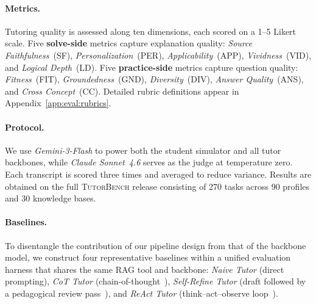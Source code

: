 \paragraph{Metrics.}
Tutoring quality is assessed along ten dimensions, each scored on a 1--5 Likert scale.
Five \textbf{solve-side} metrics capture explanation quality: \emph{Source Faithfulness}~(SF), \emph{Personalization}~(PER), \emph{Applicability}~(APP), \emph{Vividness}~(VID), and \emph{Logical Depth}~(LD).
Five \textbf{practice-side} metrics capture question quality: \emph{Fitness}~(FIT), \emph{Groundedness}~(GND), \emph{Diversity}~(DIV), \emph{Answer Quality}~(ANS), and \emph{Cross Concept}~(CC).
Detailed rubric definitions appear in Appendix~\ref{app:eval:rubrics}.

\paragraph{Protocol.}
We use \emph{Gemini-3-Flash} to power both the student simulator and all tutor backbones, while \emph{Claude Sonnet~4.6} serves as the judge at temperature zero.
Each transcript is scored three times and averaged to reduce variance.
Results are obtained on the full \textsc{TutorBench} release consisting of 270 tasks across 90 profiles and 30 knowledge bases.

\paragraph{Baselines.}
To disentangle the contribution of our pipeline design from that of the backbone model, we construct four representative baselines within a unified evaluation harness that shares the same RAG tool and backbone:
\emph{Naive Tutor} (direct prompting),
\emph{CoT Tutor} (chain-of-thought~\citep{wei2022chain}),
\emph{Self-Refine Tutor} (draft followed by a pedagogical review pass~\citep{madaan2024selfrefine}), and
\emph{ReAct Tutor} (think--act--observe loop~\citep{yao2023reactsynergizingreasoningacting}).

